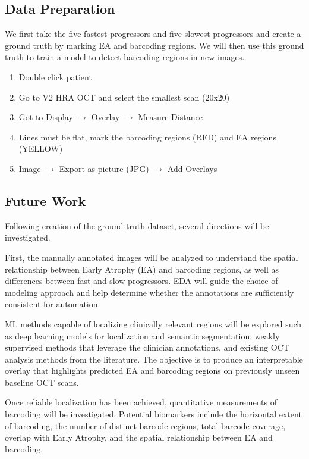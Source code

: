 \documentclass[11pt]{article}
\begin{document}
\subsection{Data Preparation}

We first take the five fastest progressors and five slowest progressors and create a ground truth by marking EA and barcoding regions. We will then use this ground truth to train a model to detect barcoding regions in new images.
\begin{enumerate}
    \item Double click patient
    \item Go to V2 HRA OCT and select the smallest scan (20x20)
    \item Got to Display $\rightarrow$ Overlay $\rightarrow$ Measure Distance
    \item Lines must be flat, mark the barcoding regions (RED) and EA regions (YELLOW)
    \item Image $\rightarrow$ Export as picture (JPG) $\rightarrow$ Add Overlays
\end{enumerate}

\subsection{Future Work}

Following creation of the ground truth dataset, several directions will be investigated.

First, the manually annotated images will be analyzed to understand the spatial relationship between Early Atrophy (EA) and barcoding regions, as well as differences between fast and slow progressors. EDA will guide the choice of modeling approach and help determine whether the annotations are sufficiently consistent for automation.

ML methods capable of localizing clinically relevant regions will be explored such as deep learning models for localization and semantic segmentation, weakly supervised methods that leverage the clinician annotations, and existing OCT analysis methods from the literature. The objective is to produce an interpretable overlay that highlights predicted EA and barcoding regions on previously unseen baseline OCT scans.

Once reliable localization has been achieved, quantitative measurements of barcoding will be investigated. Potential biomarkers include the horizontal extent of barcoding, the number of distinct barcode regions, total barcode coverage, overlap with Early Atrophy, and the spatial relationship between EA and barcoding. 
\end{document}
